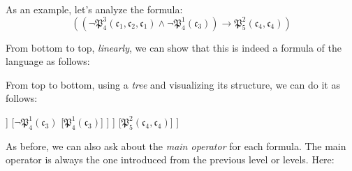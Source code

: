 As an example, let's analyze the formula:
\[
((\neg \mathfrak{P}^3_4(\mathfrak{c}_1, \mathfrak{c_2}, \mathfrak{c_1}) \wedge \neg \mathfrak{P}^1_4(\mathfrak{c}_3)) \rightarrow \mathfrak{P}^2_5(\mathfrak{c}_4, \mathfrak{c}_4))
\]

From bottom to top, \textit{linearly}, we can show that this is indeed a formula of the language as follows:

\begin{center}
\begin{axiomatic}
\end{axiomatic}
\end{center}

From top to bottom, using a \textit{tree} and visualizing its structure, we can do it as follows: 

\begin{center}
	\begin{forest}
		[{$((\neg \mathfrak{P}^3_4(\mathfrak{c}_1, \mathfrak{c_2}, \mathfrak{c_1}) \wedge \neg \mathfrak{P}^1_4(\mathfrak{c}_3)) \rightarrow \mathfrak{P}^2_5(\mathfrak{c}_4, \mathfrak{c}_4))$}
		[{$(\neg \mathfrak{P}^3_4(\mathfrak{c}_1, \mathfrak{c_2}, \mathfrak{c_1}) \wedge \neg \mathfrak{P}^1_4(\mathfrak{c}_3))$}
			[{$\neg \mathfrak{P}^3_4(\mathfrak{c}_1, \mathfrak{c_2}, \mathfrak{c_1})$}
				[{$\mathfrak{P}^3_4(\mathfrak{c}_1, \mathfrak{c_2}, \mathfrak{c_1})$}]
			]
			[{$\neg \mathfrak{P}^1_4(\mathfrak{c}_3)$}
				[{$\mathfrak{P}^1_4(\mathfrak{c}_3)$}]
			]
		]
		[{$\mathfrak{P}^2_5(\mathfrak{c}_4, \mathfrak{c}_4)$}]
		]
	\end{forest}
\end{center}

As before, we can also ask about the \textit{main operator} for each formula. The main operator is always the one introduced from the previous level or levels. Here:

